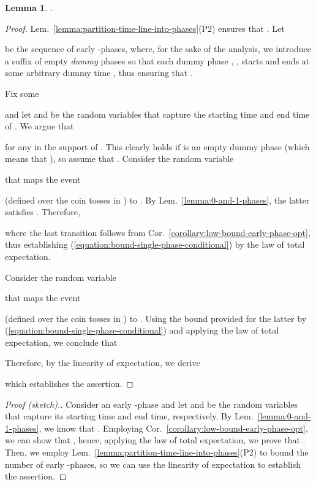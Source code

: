 \documentclass[11pt]{article}
\def\LongVersion{}
\def\LongVersionEnd{}
\def\ShortVersion{}
\def\ShortVersionEnd{}
\newtheorem{lemma}[theorem]{Lemma}
\theoremstyle{definition}
\theoremstyle{plain}
\newtheorem{lemma}[theorem]{Lemma}
\theoremstyle{definition}
\theoremstyle{plain}
\newtheorem{lemma}{Lemma}[section]
\theoremstyle{definition}
\theoremstyle{plain}
\newcommand{\Lem}{Lem.}
\newcommand{\Cor}{Cor.}
\begin{document}
\begin{lemma} \label{lemma:bound-early-phases}
.
\end{lemma}
\LongVersion \begin{proof}
\Lem{}~\ref{lemma:partition-time-line-into-phases}(P2) ensures
that
.
Let

be the sequence of early -phases, where, for the sake of the analysis, we
introduce a suffix of empty \emph{dummy} phases so that each dummy phase
, ,
starts and ends at some arbitrary dummy time
,
thus ensuring that
.

Fix some

and let  and  be the random variables that capture the starting
time and end time of .
We argue that

for any  in the support of .
This clearly holds if  is an empty dummy phase (which means that
),
so assume that
.
Consider the random variable

that maps the event

(defined over the coin tosses in )
to
.
By \Lem{}~\ref{lemma:0-and-1-phases}, the latter satisfies
.
Therefore,

where the last transition follows from
\Cor{}~\ref{corollary:low-bound-early-phase-opt},
thus establishing (\ref{equation:bound-single-phase-conditional}) by the law
of total expectation.

Consider the random variable

that maps the event

(defined over the coin tosses in )
to
.
Using the bound provided for the latter by
(\ref{equation:bound-single-phase-conditional}) and applying the law of total
expectation, we conclude that

Therefore, by the linearity of expectation, we derive

which establishes the assertion.
\end{proof}
\LongVersionEnd \ShortVersion \sloppy
\begin{proof}[Proof (sketch).]
Consider an early -phase  and let  and  be the random
variables that capture its starting time and end time, respectively.
By \Lem{}~\ref{lemma:0-and-1-phases}, we know that
.
Employing \Cor{}~\ref{corollary:low-bound-early-phase-opt}, we can
show that
,
hence, applying the law of total expectation, we prove that
.
Then, we employ \Lem{}~\ref{lemma:partition-time-line-into-phases}(P2) to
bound the number of early -phases, so we can use the linearity of
expectation to establish the assertion.
\end{proof}
\par\fussy
\ShortVersionEnd 
\end{document}
